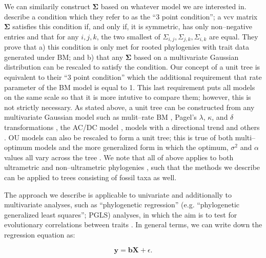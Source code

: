 \documentclass[12pt]{article}
\begin{document}
We can similarily construct $\mathbf{\Sigma}$ based on whatever model we are interested in. \citet{HoAne2013} describe a condition which they refer to as the ``3 point condition''; a vcv matrix $\mathbf{\Sigma}$ satisfies this condition if, and only if, it is symmetric, has only non--negative entries and that for any $i,j,k$, the two smallest of $\Sigma_{i,j}, \Sigma_{j,k}, \Sigma_{i,k}$ are equal. They prove that a) this condition is only met for rooted phylogenies with trait data generated under BM; and b) that any $\mathbf{\Sigma}$ based on a multivariate Gaussian distribution can be rescaled to satisfy the condition. Our concept of a unit tree is equivalent to their ``3 point condition'' which the additional requirement that rate parameter of the BM model is equal to 1. This last requirement puts all models on the same scale so that it is more intutive to compare them; however, this is not strictly necessary. As stated above, a unit tree can be constructed from any multivariate Gaussian model such as mulit--rate BM \citep{Omeara2006, Thomas2006, Eastman2011, Revell2012, Motmot}, Pagel's $\lambda$, $\kappa$, and $\delta$ transformations \citep{Pagel1997, Pagel1999}, the AC/DC model \citep{Blomberg2003} \citep[a.k.a. `EB';][]{Harmon2010, SlaterPennell}, models with a directional trend \citep{Hunt2008} and others \citep[e.g.][]{SlaterMEE}. OU models can also be rescaled to form a unit tree; this is true of both multi--optimum \citep{ButlerKing2004} models and the more generalized form \citep{Beaulieu2012, IngramMahler, UyedaBayou} in which the optimum, $\sigma^2$ and $\alpha$ values all vary across the tree \citep{HoAne2013}. We note that all of above applies to both ultrametric and non--ultrametric phylogenies \citep{HoAne2013}, such that the methods we describe can be applied to trees consisting of fossil taxa as well.

The approach we describe is applicable to univariate and additionally to multivariate analyses, such as ``phylogenetic regression'' (e.g. ``phylogenetic generalized least squares''; PGLS) analyses, in which the aim is to test for evolutionary correlations between traits \citep{Grafen1989, Rohlf2001}. In general terms, we can write down the regression equation as:

\begin{equation}
\mathbf{y} = \mathbf{b}\mathbf{X} + \epsilon .
\end{equation}
\end{document}
